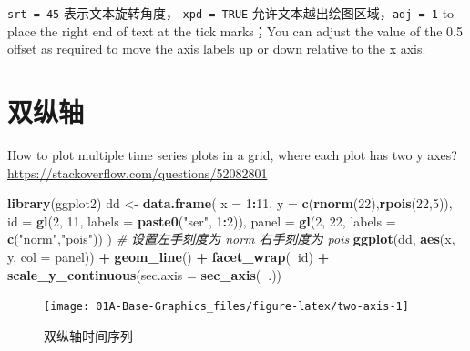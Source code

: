 \documentclass[a4paper,oneside,UTF8]{book}
\newenvironment{Shaded}{\begin{snugshade}}{\end{snugshade}}
\newcommand{\CommentTok}[1]{\textcolor[rgb]{0.56,0.35,0.01}{\textit{#1}}}
\newcommand{\DataTypeTok}[1]{\textcolor[rgb]{0.13,0.29,0.53}{#1}}
\newcommand{\DecValTok}[1]{\textcolor[rgb]{0.00,0.00,0.81}{#1}}
\newcommand{\KeywordTok}[1]{\textcolor[rgb]{0.13,0.29,0.53}{\textbf{#1}}}
\newcommand{\NormalTok}[1]{#1}
\newcommand{\OperatorTok}[1]{\textcolor[rgb]{0.81,0.36,0.00}{\textbf{#1}}}
\newcommand{\StringTok}[1]{\textcolor[rgb]{0.31,0.60,0.02}{#1}}
\begin{document}
\texttt{srt\ =\ 45} 表示文本旋转角度， \texttt{xpd\ =\ TRUE} 允许文本越出绘图区域，\texttt{adj\ =\ 1} to place the right end of text at the tick marks；You can adjust the value of the 0.5 offset as required to move the axis labels up or down relative to the x axis.

\hypertarget{double-y-axis}{%
\section{双纵轴}\label{double-y-axis}}

How to plot multiple time series plots in a grid, where each plot has two y axes? \url{https://stackoverflow.com/questions/52082801}

\begin{Shaded}
\begin{Highlighting}[]
\KeywordTok{library}\NormalTok{(ggplot2)}
\NormalTok{dd <-}\StringTok{ }\KeywordTok{data.frame}\NormalTok{(}
  \DataTypeTok{x =} \DecValTok{1}\OperatorTok{:}\DecValTok{11}\NormalTok{, }\DataTypeTok{y =} \KeywordTok{c}\NormalTok{(}\KeywordTok{rnorm}\NormalTok{(}\DecValTok{22}\NormalTok{),}\KeywordTok{rpois}\NormalTok{(}\DecValTok{22}\NormalTok{,}\DecValTok{5}\NormalTok{)),}
  \DataTypeTok{id =} \KeywordTok{gl}\NormalTok{(}\DecValTok{2}\NormalTok{, }\DecValTok{11}\NormalTok{, }\DataTypeTok{labels =} \KeywordTok{paste0}\NormalTok{(}\StringTok{"ser"}\NormalTok{, }\DecValTok{1}\OperatorTok{:}\DecValTok{2}\NormalTok{)),}
  \DataTypeTok{panel =} \KeywordTok{gl}\NormalTok{(}\DecValTok{2}\NormalTok{, }\DecValTok{22}\NormalTok{, }\DataTypeTok{labels =} \KeywordTok{c}\NormalTok{(}\StringTok{"norm"}\NormalTok{,}\StringTok{"pois"}\NormalTok{))}
\NormalTok{)}
\CommentTok{# 设置左手刻度为 norm 右手刻度为 pois}
\KeywordTok{ggplot}\NormalTok{(dd, }\KeywordTok{aes}\NormalTok{(x, y, }\DataTypeTok{col =}\NormalTok{ panel)) }\OperatorTok{+}
\StringTok{  }\KeywordTok{geom_line}\NormalTok{() }\OperatorTok{+}
\StringTok{  }\KeywordTok{facet_wrap}\NormalTok{(}\OperatorTok{~}\NormalTok{id) }\OperatorTok{+}
\StringTok{  }\KeywordTok{scale_y_continuous}\NormalTok{(}\DataTypeTok{sec.axis =} \KeywordTok{sec_axis}\NormalTok{(}\OperatorTok{~}\NormalTok{.))}
\end{Highlighting}
\end{Shaded}

\begin{figure}

{\centering \texttt{[image: 01A-Base-Graphics\_files/figure-latex/two-axis-1]} 

}

\caption{双纵轴时间序列}\label{fig:two-axis}
\end{figure}
\end{document}
